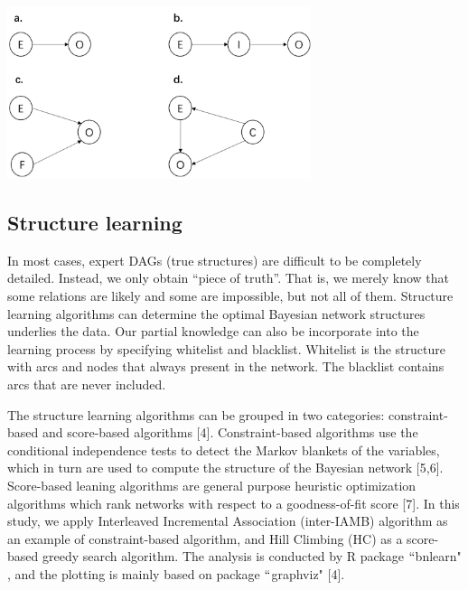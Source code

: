 \documentclass{article}
\begin{document}
\begin{center}
\includegraphics[width=3.5in,height=1.98in]{./media/image1.png}
\end{center}
\vspace{-2.5em}


\subsection{Structure learning}
In most cases, expert DAGs (true structures) are difficult to be completely detailed. Instead, we only obtain “piece of truth”. That is, we merely know that some relations are likely and some are impossible, but not all of them. Structure learning algorithms can determine the optimal Bayesian network structures underlies the data. Our partial knowledge can also be incorporate into the learning process by specifying whitelist and blacklist. Whitelist is the structure with arcs and nodes that always present in the network. The blacklist contains arcs that are never included. \par

The structure learning algorithms can be grouped in two categories: constraint-based and score-based algorithms [4]. Constraint-based algorithms use the conditional independence tests to detect the Markov blankets of the variables, which in turn are used to compute the structure of the Bayesian network [5,6]. Score-based leaning algorithms are general purpose heuristic optimization algorithms which rank networks with respect to a goodness-of-fit score [7]. In this study, we apply Interleaved Incremental Association (inter-IAMB) algorithm as an example of constraint-based algorithm, and Hill Climbing (HC) as a score-based greedy search algorithm. The analysis is conducted by R package $``$bnlearn" , and the plotting is mainly based on package $``$graphviz" [4]. \par 
\end{document}
